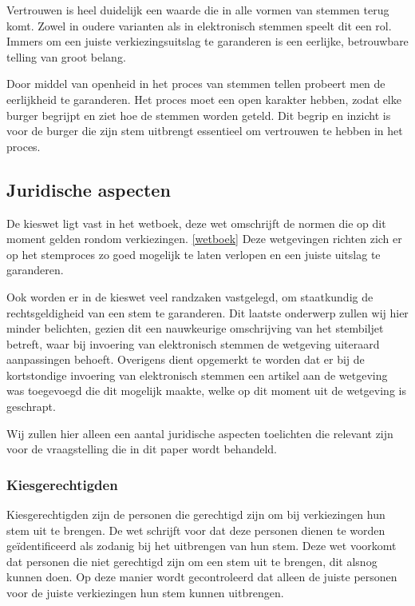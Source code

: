 \documentclass[a4paper]{article}
\begin{document}
Vertrouwen is heel duidelijk een waarde die in alle vormen van stemmen terug komt.
Zowel in oudere varianten als in elektronisch stemmen speelt dit een rol.
Immers om een juiste verkiezingsuitslag te garanderen is een eerlijke, betrouwbare telling van groot belang.

Door middel van openheid in het proces van stemmen tellen probeert men de eerlijkheid te garanderen.
Het proces moet een open karakter hebben, zodat elke burger begrijpt en ziet hoe de stemmen worden geteld.
Dit begrip en inzicht is voor de burger die zijn stem uitbrengt essentieel om vertrouwen te hebben in het proces.

\subsection{Juridische aspecten}
\label{text:juridisch}
De kieswet ligt vast in het wetboek, deze wet omschrijft de normen die op dit moment gelden rondom verkiezingen. \ref{wetboek}
Deze wetgevingen richten zich er op het stemproces zo goed mogelijk te laten verlopen en een juiste uitslag te garanderen.

Ook worden er in de kieswet veel randzaken vastgelegd, om staatkundig de rechtsgeldigheid van een stem te garanderen.
Dit laatste onderwerp zullen wij hier minder belichten, gezien dit een nauwkeurige omschrijving van het stembiljet betreft, waar bij invoering van elektronisch stemmen de wetgeving uiteraard aanpassingen behoeft.
Overigens dient opgemerkt te worden dat er bij de kortstondige invoering van elektronisch stemmen een artikel aan de wetgeving was toegevoegd die dit mogelijk maakte, welke op dit moment uit de wetgeving is geschrapt.

Wij zullen hier alleen een aantal juridische aspecten toelichten die relevant zijn voor de vraagstelling die in dit paper wordt behandeld.

\subsubsection{Kiesgerechtigden}
Kiesgerechtigden zijn de personen die gerechtigd zijn om bij verkiezingen hun stem uit te brengen.
De wet schrijft voor dat deze personen dienen te worden ge\"identificeerd als zodanig bij het uitbrengen van hun stem.
Deze wet voorkomt dat personen die niet gerechtigd zijn om een stem uit te brengen, dit alsnog kunnen doen.
Op deze manier wordt gecontroleerd dat alleen de juiste personen voor de juiste verkiezingen hun stem kunnen uitbrengen.
\end{document}
